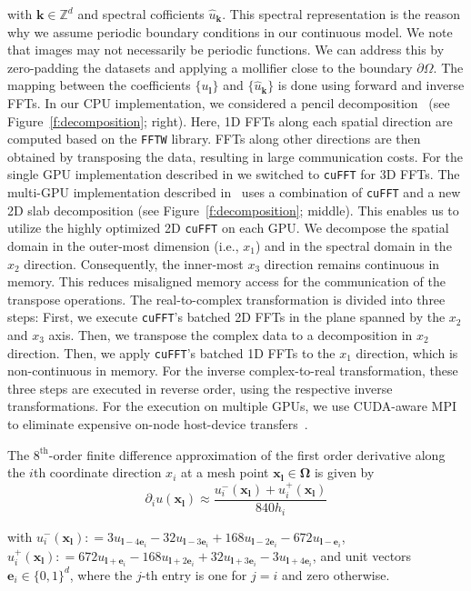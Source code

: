 \documentclass[11pt]{amsart}
\newcommand{\figref}[1]{Figure~\ref{#1}}
\newcommand\di[1]{\ensuremath{\mathbf{#1}}}
\newcommand{\defeq}{\ensuremath{\mathrel{\mathop:}=}}
\renewcommand{\vec}[1]{\ensuremath{\boldsymbol{#1}}}
\begin{document}
\noindent with $\vec{k} \in \mathbb{Z}^d$ and spectral cofficients $\hat{u}_{\vec{k}}$. This spectral representation is the reason why we assume periodic boundary conditions in our continuous model. We note that images may not necessarily be periodic functions. We can address this by zero-padding the datasets and applying a mollifier close to the boundary $\partial \Omega$. The mapping between the coefficients $\{u_{\vec{l}}\}$ and $\{\hat{u}_{\vec{k}}\}$ is done using forward and inverse FFTs. In our CPU implementation, we considered a pencil decomposition~\cite{Mang:2016b,Mang:2019a,Gholami:2017a} (see \figref{f:decomposition}; right). Here, 1D FFTs along each spatial direction are computed based on the {\tt FFTW} library. FFTs along other directions are then obtained by transposing the data, resulting in large communication costs. For the single GPU implementation described in \cite{Brunn:2021a} we switched to \texttt{cuFFT} for 3D FFTs. The multi-GPU implementation described in~\cite{Brunn:2020a} uses a combination of \texttt{cuFFT} and a new 2D slab decomposition (see \figref{f:decomposition}; middle). This enables us to utilize the highly optimized 2D \texttt{cuFFT} on each GPU. We decompose the spatial domain in the outer-most dimension (i.e., $x_1$) and in the spectral domain in the $x_2$ direction. Consequently, the inner-most $x_3$ direction remains continuous in memory. This reduces misaligned memory access for the communication of the transpose operations.  The real-to-complex transformation is divided into three steps: First,  we execute \texttt{cuFFT}'s batched 2D FFTs in the plane spanned by the $x_2$ and $x_3$ axis. Then, we transpose the complex data to a decomposition in $x_2$ direction. Then, we apply \texttt{cuFFT}'s batched 1D FFTs to the $x_1$ direction, which is non-continuous in memory. For the inverse complex-to-real transformation, these three steps are executed in reverse order, using the respective inverse transformations. For the execution on multiple GPUs, we use CUDA-aware MPI to eliminate expensive on-node host-device transfers~\cite{Brunn:2020a}.

The $8^{\text{th}}$-order finite difference approximation of the first order derivative along the $i$th coordinate direction $x_i$ at a mesh point $\di{x}_{\vec{l}} \in \di{\Omega}$ is given by
\[
\partial_i u(\di{x}_{\vec{l}}) \approx
\frac{u^-_i(\di{x}_{\vec{l}})  +  u^+_i(\di{x}_{\vec{l}})}{840 h_i}
\]

\noindent with $u^-_i(\di{x}_{\vec{l}}) \defeq  3u_{\vec{l} - 4 \vec{e}_i} - 32u_{\vec{l} - 3 \vec{e}_i} + 168u_{\vec{l} - 2 \vec{e}_i} - 672 u_{\vec{l} - \vec{e}_i}$,  $u^+_i(\di{x}_{\vec{l}}) \defeq  672 u_{\vec{l} + \vec{e}_i} - 168u_{\vec{l} + 2 \vec{e}_i} + 32u_{\vec{l} + 3 \vec{e}_i} - 3u_{\vec{l} + 4 \vec{e}_i}$, and unit vectors $\vec{e}_i \in \{0,1\}^d$, where the $j$-th entry is one for $j = i$ and zero otherwise.
\end{document}
